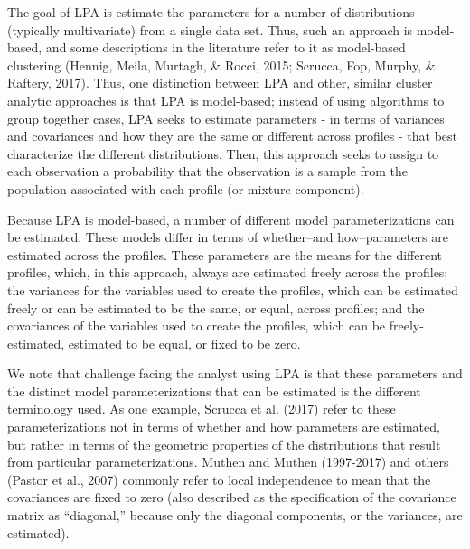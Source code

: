 \documentclass[man]{apa6}
\begin{document}
The goal of LPA is estimate the parameters for a number of distributions
(typically multivariate) from a single data set. Thus, such an approach is
model-based, and some descriptions in the literature refer to it as model-based
clustering (Hennig, Meila, Murtagh, \& Rocci, 2015; Scrucca, Fop, Murphy, \&
Raftery, 2017). Thus, one distinction between LPA and other, similar cluster
analytic approaches is that LPA is model-based; instead of using algorithms to
group together cases, LPA seeks to estimate parameters - in terms of variances
and covariances and how they are the same or different across profiles - that
best characterize the different distributions. Then, this approach seeks to
assign to each observation a probability that the observation is a sample from
the population associated with each profile (or mixture component).

Because LPA is model-based, a number of different model parameterizations can be
estimated. These models differ in terms of whether--and how--parameters are
estimated across the profiles. These parameters are the means for the different
profiles, which, in this approach, always are estimated freely across the
profiles; the variances for the variables used to create the profiles, which can
be estimated freely or can be estimated to be the same, or equal, across
profiles; and the covariances of the variables used to create the profiles,
which can be freely-estimated, estimated to be equal, or fixed to be zero.

We note that challenge facing the analyst using LPA is that these
parameters and the distinct model parameterizations that can be estimated is the
different terminology used. As one example, Scrucca et al. (2017) refer to these
parameterizations not in terms of whether and how parameters are estimated, but
rather in terms of the geometric properties of the distributions that result
from particular parameterizations. Muthen and Muthen (1997-2017) and others
(Pastor et al., 2007) commonly refer to local independence to mean that the
covariances are fixed to zero (also described as the specification of the
covariance matrix as \enquote{diagonal,} because only the diagonal components, or the
variances, are estimated).
\end{document}
